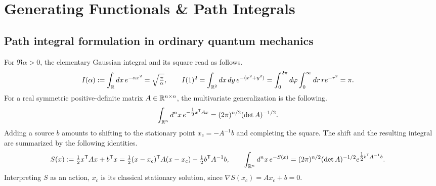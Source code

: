 \documentclass[../QFT_main.tex]{subfiles}
\begin{document}
\chapter{Generating Functionals \& Path Integrals}\label{ch:path_integral_formulation}



\section{Path integral formulation in ordinary quantum mechanics}

\begin{mytheorem}
For $\Re\alpha>0$, the elementary Gaussian integral and its square read as follows.
{\small\begin{align}\begin{aligned}
    I(\alpha) &:= \int_{\mathbb{R}}dx\,e^{-\alpha x^2} = \sqrt{\tfrac{\pi}{\alpha}}, \qquad I(1)^2 = \int_{\mathbb{R}^2}dx\,dy\,e^{-(x^2+y^2)} = \int_0^{2\pi}d\varphi\int_0^\infty dr\,r e^{-r^2} = \pi.
\end{aligned}\end{align}}
For a real symmetric positive-definite matrix $A\in\mathbb{R}^{n\times n}$, the multivariate generalization is the following.
{\small\begin{align}\begin{aligned}
    \int_{\mathbb{R}^n}d^nx\,e^{-\tfrac12 x^{\mathsf T}Ax} &= (2\pi)^{n/2}(\det A)^{-1/2}.
\end{aligned}\end{align}}
Adding a source $b$ amounts to shifting to the stationary point $x_c=-A^{-1}b$ and completing the square.
The shift and the resulting integral are summarized by the following identities.
{\small\begin{align}\begin{aligned}
    S(x) &:= \tfrac12 x^{\mathsf T}Ax+b^{\mathsf T}x = \tfrac12 (x-x_c)^{\mathsf T}A(x-x_c)-\tfrac12 b^{\mathsf T}A^{-1}b, \qquad \int_{\mathbb{R}^n}d^nx\,e^{-S(x)} = (2\pi)^{n/2}(\det A)^{-1/2}e^{\tfrac12 b^{\mathsf T}A^{-1}b}.
\end{aligned}\end{align}}
Interpreting $S$ as an action, $x_c$ is its classical stationary solution, since $\nabla S(x_c)=Ax_c+b=0$.
\end{mytheorem}
\end{document}
